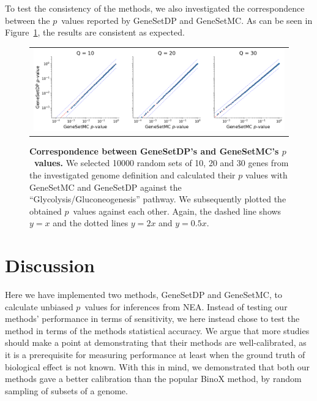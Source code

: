 \documentclass[10pt,letterpaper]{article}
\begin{document}
To test the consistency of the methods, we also investigated the correspondence between the $p$~values reported by GeneSetDP and GeneSetMC. As can be seen in Figure~\ref{fig:pscatter}, the results are consistent as expected.

\begin{figure}[htb]
  \begin{center}
		  \begin{tabular}[t]{c}
				\includegraphics[width=.9\textwidth]{figures/scatter_dp_mc.png}
		\end{tabular}
  \end{center}
  \caption{{\bf Correspondence between GeneSetDP's and GeneSetMC's $p$~values.} We selected 10000 random sets of 10, 20 and 30 genes from the investigated genome definition and calculated their $p$ values with GeneSetMC and GeneSetDP against the ``Glycolysis/Gluconeogenesis'' pathway. We subsequently plotted the obtained $p$~values against each other. Again, the dashed line shows $y = x$ and the dotted lines $y = 2x$ and $y = 0.5x$.}
  \label{fig:pscatter}
\end{figure}



\section*{Discussion}

Here we have implemented two methods, GeneSetDP and GeneSetMC, to calculate unbiased $p$~values for inferences from NEA.
Instead of testing our methods' performance in terms of sensitivity, we here instead chose to test the method in terms of the methods statistical accuracy. We argue that more studies should make a point at demonstrating that their methods are well-calibrated, as it is a prerequisite for measuring performance at least when the ground truth of biological effect is not known.
With this in mind, we demonstrated that both our methods gave a better calibration than the popular BinoX method, by random sampling of subsets of a genome.
\end{document}
